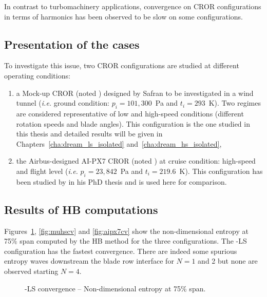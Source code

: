 
In contrast to turbomachinery applications, convergence
on CROR configurations
in terms of harmonics has been observed to be
slow on some configurations.

\subsection{Presentation of the cases}

To investigate this issue, two CROR configurations are studied at
different operating conditions:
\begin{enumerate}
\item a Mock-up CROR (noted \mockup) designed by Safran to be
  investigated in a wind tunnel (\emph{i.e.} ground condition:
  $p_i=101,300$~Pa and $t_i=293$~K). Two regimes are considered
  representative of low and high-speed conditions (different rotation
  speeds and blade angles). This configuration is the one
  studied in this thesis and detailed results will be given 
  in Chapters~\ref{cha:dream_ls_isolated} and~\ref{cha:dream_hs_isolated},
\item the Airbus-designed AI-PX7 CROR (noted \aipx) at cruise
  condition: high-speed 
  and flight level (\emph{i.e.}  $p_i=23,842$~Pa and
  $t_i=219.6$~K). This configuration has been studied by
  \citet{ThesisFrancois} in his PhD thesis and is used
  here for comparison.
\end{enumerate}

\subsection{Results of HB computations}

Figures~\ref{fig:mulscv},
\ref{fig:muhscv} and \ref{fig:aipx7cv} show the non-dimensional
entropy at 75\% span computed by the HB method for the three
configurations. The \mockup-LS configuration has the fastest
convergence. There are indeed some spurious entropy waves downstream the blade
row interface for $N=1$ and 2 but none are observed
starting $N=4$.
\begin{figure}[htp]
  \centering
  \caption{\mockup-LS convergence -- Non-dimensional entropy at 75\% span.}
  \label{fig:mulscv}
\end{figure}


